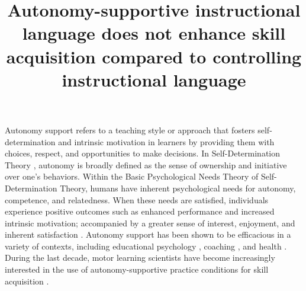 \documentclass[doc,floatsintext,donotrepeattitle,letterpaper,12pt]{apa7}
\title{Autonomy-supportive instructional language does not enhance skill acquisition compared to controlling instructional language}
\begin{document}
\maketitle

Autonomy support refers to a teaching style or approach that fosters self-determination and intrinsic motivation in learners by providing them with choices, respect, and opportunities to make decisions. In Self-Determination Theory \autocite{deci2012,ryan2020}, autonomy is broadly defined as the sense of ownership and initiative over one's behaviors. Within the Basic Psychological Needs Theory \autocite{ryan2000,ryan2017} of Self-Determination Theory, humans have inherent psychological needs for autonomy, competence, and relatedness. When these needs are satisfied, individuals experience positive outcomes such as enhanced performance and increased intrinsic motivation;  accompanied by a greater sense of interest, enjoyment, and inherent satisfaction \autocite{ryan2000}. Autonomy support has been shown to be efficacious in a variety of contexts, including educational psychology \autocites[see][for reviews]{reeve2009,ryan2020}[see][for a meta-analysis]{su2011}, coaching \autocite[see][for a meta-analysis]{mossman2022}, and health \autocite[see][for a meta-analysis]{okada2021}. During the last decade, motor learning scientists have become increasingly interested in the use of autonomy-supportive practice conditions for skill acquisition \autocite[see][for reviews]{sanli2013,stemarie2020,wulf2016}.
\end{document}
